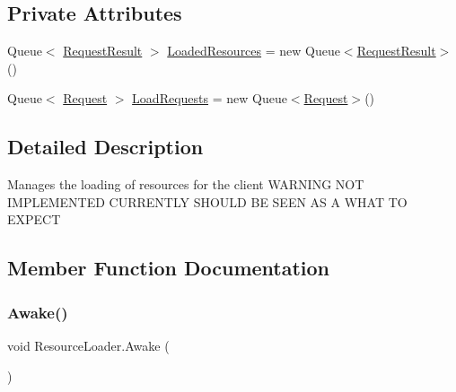 \subsection*{Private Attributes}
\begin{DoxyCompactItemize}
\item 
Queue$<$ \mbox{\hyperlink{struct_resource_loader_1_1_request_result}{Request\+Result}} $>$ \mbox{\hyperlink{class_resource_loader_aac461f634dc821609293616d32e7288e}{Loaded\+Resources}} = new Queue$<$\mbox{\hyperlink{struct_resource_loader_1_1_request_result}{Request\+Result}}$>$()
\item 
Queue$<$ \mbox{\hyperlink{struct_resource_loader_1_1_request}{Request}} $>$ \mbox{\hyperlink{class_resource_loader_acd6d1957bdc4e0212991af05e3454633}{Load\+Requests}} = new Queue$<$\mbox{\hyperlink{struct_resource_loader_1_1_request}{Request}}$>$()
\end{DoxyCompactItemize}


\subsection{Detailed Description}
Manages the loading of resources for the client W\+A\+R\+N\+I\+NG N\+OT I\+M\+P\+L\+E\+M\+E\+N\+T\+ED C\+U\+R\+R\+E\+N\+T\+LY S\+H\+O\+U\+LD BE S\+E\+EN AS A W\+H\+AT TO E\+X\+P\+E\+CT 



\subsection{Member Function Documentation}
\mbox{\label{class_resource_loader_ad258acc6c5c963d5ca93dbe36e243d20}} 
\subsubsection{\texorpdfstring{Awake()}{Awake()}}
{\footnotesize\ttfamily void Resource\+Loader.\+Awake (\begin{DoxyParamCaption}{ }\end{DoxyParamCaption})\hspace{0.3cm}{\ttfamily [private]}}

\mbox{\label{class_resource_loader_a088ef33ee82be6e64028b6b5512fad5d}} 
